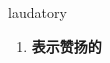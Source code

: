 
\begin{frame}
{\huge laudatory}
\begin{center}
\begin{enumerate}\Large
  \item \textbf{表示赞扬的}
\end{enumerate}
\end{center}
\end{frame}
